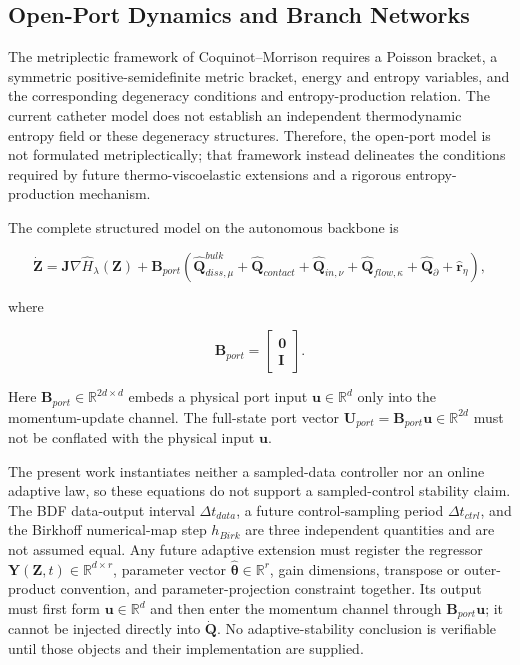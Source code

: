 \subsection{Open-Port Dynamics and Branch Networks}\label{sec:chnn-4-3}

The metriplectic framework of Coquinot--Morrison requires a Poisson bracket, a symmetric positive-semidefinite metric bracket, energy and entropy variables, and the corresponding degeneracy conditions and entropy-production relation.\cite{Coquinot2020Metriplectic} The current catheter model does not establish an independent thermodynamic entropy field or these degeneracy structures. Therefore, the open-port model is not formulated metriplectically; that framework instead delineates the conditions required by future thermo-viscoelastic extensions and a rigorous entropy-production mechanism.

The complete structured model on the autonomous backbone is

\begin{equation}
\label{eq:chnn-4-17}
\boxed{\dot{\mathbf{Z}} = \mathbf{J}\nabla{\widehat{H}}_{\lambda}\left( \mathbf{Z} \right) + \mathbf{B}_{port}\left( {\widehat{\mathbf{Q}}}_{diss,\mu}^{bulk} + {\widehat{\mathbf{Q}}}_{contact} + {\widehat{\mathbf{Q}}}_{in,\nu} + {\widehat{\mathbf{Q}}}_{flow,\kappa} + {\widehat{\mathbf{Q}}}_{\partial} + {\widehat{\mathbf{r}}}_{\eta} \right),}
\end{equation}

where

\begin{equation}
\label{eq:chnn-4-18}
\mathbf{B}_{port} = \begin{bmatrix}
\mathbf{0} \\
\mathbf{I}
\end{bmatrix}.
\end{equation}

Here \(\mathbf{B}_{port}\in\mathbb{R}^{2d\times d}\) embeds a physical port input \(\mathbf{u}\in\mathbb{R}^{d}\) only into the momentum-update channel. The full-state port vector \(\mathbf{U}_{port}=\mathbf{B}_{port}\mathbf{u}\in\mathbb{R}^{2d}\) must not be conflated with the physical input \(\mathbf{u}\).

The present work instantiates neither a sampled-data controller nor an online adaptive law, so these equations do not support a sampled-control stability claim. The BDF data-output interval \(\Delta t_{data}\), a future control-sampling period \(\Delta t_{ctrl}\), and the Birkhoff numerical-map step \(h_{Birk}\) are three independent quantities and are not assumed equal. Any future adaptive extension must register the regressor \(\mathbf{Y}(\mathbf{Z},t)\in\mathbb{R}^{d\times r}\), parameter vector \(\widehat{\bm{\theta}}\in\mathbb{R}^{r}\), gain dimensions, transpose or outer-product convention, and parameter-projection constraint together. Its output must first form \(\mathbf{u}\in\mathbb{R}^{d}\) and then enter the momentum channel through \(\mathbf{B}_{port}\mathbf{u}\); it cannot be injected directly into \(\dot{\mathbf{Q}}\). No adaptive-stability conclusion is verifiable until those objects and their implementation are supplied.

